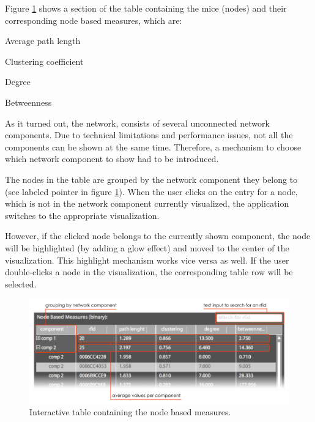 Figure \ref{fig:node_based_measures} shows a section of the table containing the mice (nodes) and their corresponding node based measures, which are:

\begin{mylist}
\item Average path length
\item Clustering coefficient
\item Degree
\item Betweenness
\end{mylist}

As it turned out, the network, consists of several unconnected network components. Due to technical limitations and performance issues, not all the components can be shown at the same time. Therefore, a mechanism to choose which network component to show had to be introduced.

The nodes in the table are grouped by the network component they belong to (see labeled pointer in figure \ref{fig:node_based_measures}). When the user clicks on the entry for a node, which is not in the network component currently visualized, the application switches to the appropriate visualization.

However, if the clicked node belongs to the currently shown component, the node will be highlighted (by adding a glow effect) and moved to the center of the visualization. This highlight mechanism works vice versa as well. If the user double-clicks a node in the visualization, the corresponding table row will be selected.

\begin{figure}[!htpb]
\begin{center}
  \includegraphics[width=\textwidth]{assets/pdf/node_based_measures.pdf}
  \caption[Node based measures]{Interactive table containing the node based measures.}
  \label{fig:node_based_measures}
\end{center}
\end{figure}

